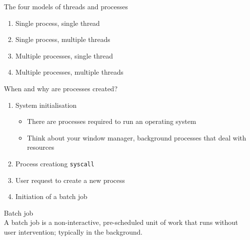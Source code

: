 \documentclass[journal, letterpaper]{IEEEtran}
\begin{document}
\begin{aside}{The four models of threads and processes}
    \begin{enumerate}
        \item Single process, single thread
        \item Single process, multiple threads
        \item Multiple processes, single thread
        \item Multiple processes, multiple threads
    \end{enumerate}
\end{aside}
\begin{example}{When and why are processes created?}
    \begin{enumerate}
        \item System initialisation
        \begin{itemize}
            \item There are processes required to run an operating system
            \item Think about your window manager, background processes that deal with resources
        \end{itemize}
        \item Process creationg \verb|syscall|
        \item User request to create a new process
        \item Initiation of a batch job
    \end{enumerate}
\end{example}
\begin{aside}{Batch job} \\
    A batch job is a non-interactive, pre-scheduled unit of work that runs without user intervention; typically in the background.
\end{aside}
\end{document}
